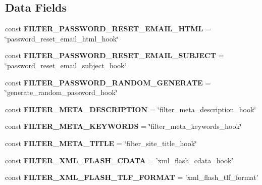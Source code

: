 \subsection*{Data Fields}
\begin{DoxyCompactItemize}
\item 
\hypertarget{class_hooks_aacafa1904a8ee256c671e6ce9fd3c639}{
const {\bfseries FILTER\_\-PASSWORD\_\-RESET\_\-EMAIL\_\-HTML} = \char`\"{}password\_\-reset\_\-email\_\-html\_\-hook\char`\"{}}
\label{class_hooks_aacafa1904a8ee256c671e6ce9fd3c639}

\item 
\hypertarget{class_hooks_a4fa7fa99380900b4113537f528d2a829}{
const {\bfseries FILTER\_\-PASSWORD\_\-RESET\_\-EMAIL\_\-SUBJECT} = \char`\"{}password\_\-reset\_\-email\_\-subject\_\-hook\char`\"{}}
\label{class_hooks_a4fa7fa99380900b4113537f528d2a829}

\item 
\hypertarget{class_hooks_a3e37e8c626760084f028bccbd6eaab3a}{
const {\bfseries FILTER\_\-PASSWORD\_\-RANDOM\_\-GENERATE} = \char`\"{}generate\_\-random\_\-password\_\-hook\char`\"{}}
\label{class_hooks_a3e37e8c626760084f028bccbd6eaab3a}

\item 
\hypertarget{class_hooks_a61fa82ce00ee5acd3a46288238b1ae4f}{
const {\bfseries FILTER\_\-META\_\-DESCRIPTION} = \char`\"{}filter\_\-meta\_\-description\_\-hook\char`\"{}}
\label{class_hooks_a61fa82ce00ee5acd3a46288238b1ae4f}

\item 
\hypertarget{class_hooks_a63a237f278c3c615aa5e790c149b842c}{
const {\bfseries FILTER\_\-META\_\-KEYWORDS} = \char`\"{}filter\_\-meta\_\-keywords\_\-hook\char`\"{}}
\label{class_hooks_a63a237f278c3c615aa5e790c149b842c}

\item 
\hypertarget{class_hooks_a12b38070787a5dccfa3c1af746cf7b65}{
const {\bfseries FILTER\_\-META\_\-TITLE} = \char`\"{}filter\_\-site\_\-title\_\-hook\char`\"{}}
\label{class_hooks_a12b38070787a5dccfa3c1af746cf7b65}

\item 
\hypertarget{class_hooks_ae19f769581578b5e8c35536cfae87437}{
const {\bfseries FILTER\_\-XML\_\-FLASH\_\-CDATA} = 'xml\_\-flash\_\-cdata\_\-hook'}
\label{class_hooks_ae19f769581578b5e8c35536cfae87437}

\item 
\hypertarget{class_hooks_aaa1c0c22081e03e3af4e364d0b110821}{
const {\bfseries FILTER\_\-XML\_\-FLASH\_\-TLF\_\-FORMAT} = 'xml\_\-flash\_\-tlf\_\-format'}
\label{class_hooks_aaa1c0c22081e03e3af4e364d0b110821}


\end{DoxyCompactItemize}
